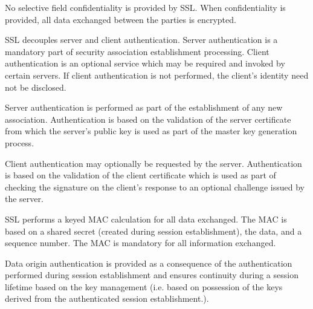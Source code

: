     
  No selective field confidentiality is provided by SSL. When
  confidentiality is provided, all data exchanged between the parties is
  encrypted.

  
  SSL decouples server and client authentication. Server authentication is
  a mandatory part of security association establishment processing.
  Client authentication is an optional service which may be required and
  invoked by certain servers. If client authentication is not performed,
  the client's identity need not be disclosed.

  
  Server authentication is performed as part of the establishment of any
  new association. Authentication is based on the validation of the server
  certificate from which the server's public key is used as part of the
  master key generation process.

  
  Client authentication may optionally be requested by the server.
  Authentication is based on the validation of the client certificate which
  is used as part of checking the signature on the client's response to an
  optional challenge issued by the server.

  
  SSL performs a keyed MAC calculation for all data exchanged. The MAC is
  based on a shared secret (created during session establishment), the
  data, and a sequence number. The MAC is mandatory for all information
  exchanged.

  
  Data origin authentication is provided as a consequence of the
  authentication performed during session establishment and ensures
  continuity during a session lifetime based on the key management (i.e.
  based on possession of the keys derived from the authenticated session
  establishment.).

